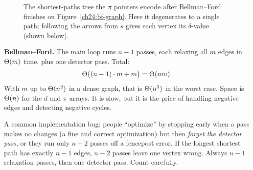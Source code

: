 \begin{figure}[h]
\centering
{}
\caption{The shortest-paths tree the $\pi$ pointers encode after Bellman--Ford
finishes on Figure~\ref{ch24:bf-graph}. Here it degenerates to a single path;
following the arrows from $s$ gives each vertex its $\delta$-value (shown below).}
\label{ch24:bf-tree}
\end{figure}

\begin{complexitybox}
\textbf{Bellman--Ford.} The main loop runs $n-1$ passes, each relaxing all $m$
edges in $\Theta(m)$ time, plus one detector pass. Total:
\[
\Theta\big((n-1)\cdot m + m\big) = \Theta(nm).
\]
With $m$ up to $\Theta(n^2)$ in a dense graph, that is $\Theta(n^3)$ in the worst case.
Space is $\Theta(n)$ for the $d$ and $\pi$ arrays. It is slow, but it is the price of
handling negative edges and detecting negative cycles.
\end{complexitybox}

\begin{trapbox}
A common implementation bug: people ``optimize'' by stopping early when a pass
makes no changes (a fine and correct optimization) but then \emph{forget the
detector pass}, or they run only $n-2$ passes off a fencepost error. If the longest
shortest path has exactly $n-1$ edges, $n-2$ passes leave one vertex wrong. Always
$n-1$ relaxation passes, then one detector pass. Count carefully.
\end{trapbox}

